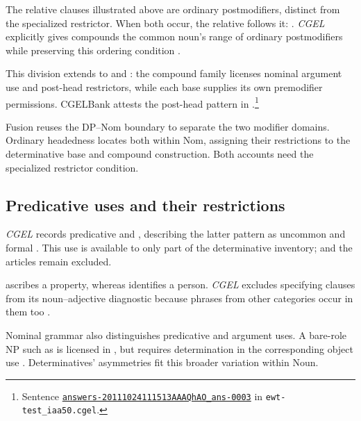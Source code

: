 \documentclass[12pt]{article}
\begin{document}
The relative clauses illustrated above are ordinary postmodifiers, distinct from the specialized restrictor. When both occur, the relative follows it: . \textit{CGEL} explicitly gives compounds the common noun's range of ordinary postmodifiers while preserving this ordering condition \citep[423]{huddleston2002}.

This division extends to  and : the compound family licenses nominal argument use and post-head restrictors, while each base supplies its own premodifier permissions. CGELBank attests the post-head pattern in .\footnote{Sentence \href{https://github.com/nert-nlp/cgel/blob/d0a2c2d8c522b23d5aa879fc9cb94948f4285b2c/datasets/ewt-test_iaa50.cgel\#L179-L181}{\nolinkurl{answers-20111024111513AAAQhAO_ans-0003}} in \nolinkurl{ewt-test_iaa50.cgel}.}

Fusion reuses the DP--Nom boundary to separate the two modifier domains. Ordinary headedness locates both within Nom, assigning their restrictions to the determinative base and compound construction. Both accounts need the specialized restrictor condition.

\subsection{Predicative uses and their restrictions}\label{sec:predication}

\textit{CGEL} records predicative  and , describing the latter pattern as uncommon and formal \citep[392, 395--396]{huddleston2002}. This use is available to only part of the determinative inventory;  and the articles remain excluded.

 ascribes a property, whereas  identifies a person. \textit{CGEL} excludes specifying  clauses from its noun--adjective diagnostic because phrases from other categories occur in them too \citep[536]{huddleston2002}.

Nominal grammar also distinguishes predicative and argument uses. A bare-role NP such as  is licensed in , but requires determination in the corresponding object use  \citep[328]{huddleston2002}. Determinatives' asymmetries fit this broader variation within Noun.
\end{document}
